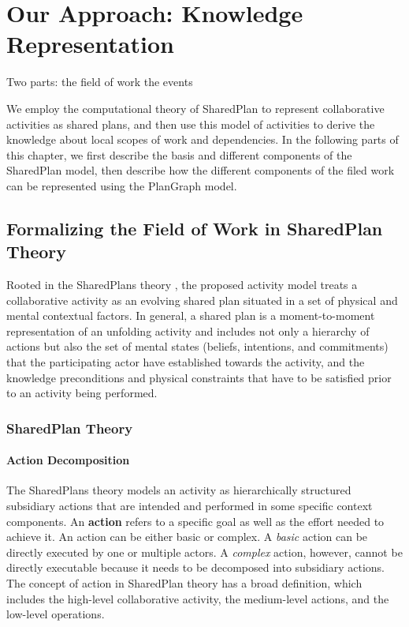 \graphicspath{{Figures/}}

\chapter{Our Approach: Knowledge Representation} %
\label{cha:knowledge_reprsentation}

Two parts:
the field of work
the events

We employ the computational theory of SharedPlan \cite{grosz1996collaborative,Grosz98theevolution} to represent collaborative activities as shared plans, and then use this model of activities to derive the knowledge about local scopes of work and dependencies. In the following parts of this chapter, we first describe the basis and different components of the SharedPlan model, then describe how the different components of the filed work can be represented using the PlanGraph model.

\section{Formalizing the Field of Work in SharedPlan Theory}
Rooted in the SharedPlans theory \cite{grosz1996collaborative,Grosz98theevolution}, the proposed activity model treats a collaborative activity as an evolving shared plan situated in a set of physical and mental contextual factors. In general, a shared plan is a moment-to-moment representation of an unfolding activity and includes not only a hierarchy of actions but also the set of mental states (beliefs, intentions, and commitments) that the participating actor have established towards the activity, and the knowledge preconditions and physical constraints that have to be satisfied prior to an activity being performed.

\subsection {SharedPlan Theory}
\subsubsection*{Action Decomposition}
The SharedPlans theory models an activity as hierarchically structured subsidiary actions that are intended and performed in some specific context components. An \textbf{action} refers to a specific goal as well as the effort needed to achieve it. An action can be either basic or complex. A \emph{basic} action can be directly executed by one or multiple actors. A \emph{complex} action, however, cannot be directly executable because it needs to be decomposed into subsidiary actions. The concept of action in SharedPlan theory has a broad definition, which includes the high-level collaborative activity, the medium-level actions, and the low-level operations.

